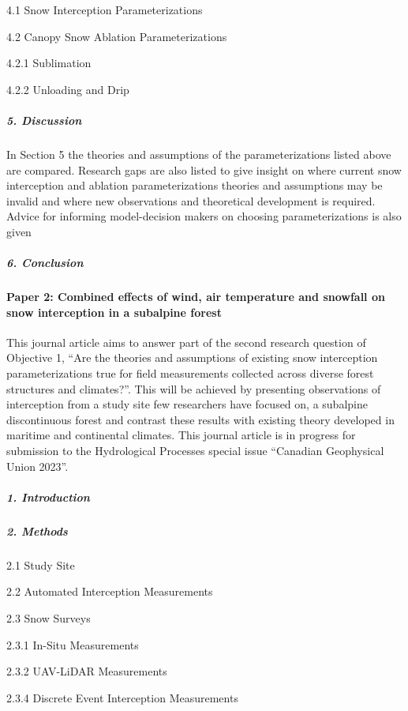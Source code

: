 \documentclass[
  letterpaper,
  DIV=11,
  numbers=noendperiod]{scrartcl}
\let\oldparagraph\paragraph
\renewcommand{\paragraph}[1]{\oldparagraph{#1}\mbox{}}
\let\oldsubparagraph\subparagraph
\renewcommand{\subparagraph}[1]{\oldsubparagraph{#1}\mbox{}}
\begin{document}
4.1 Snow Interception Parameterizations

4.2 Canopy Snow Ablation Parameterizations

4.2.1 Sublimation

4.2.2 Unloading and Drip

\subparagraph{5. Discussion}\label{discussion}

In Section 5 the theories and assumptions of the parameterizations
listed above are compared. Research gaps are also listed to give insight
on where current snow interception and ablation parameterizations
theories and assumptions may be invalid and where new observations and
theoretical development is required. Advice for informing model-decision
makers on choosing parameterizations is also given

\subparagraph{6. Conclusion}\label{conclusion}

\paragraph{Paper 2: Combined effects of wind, air temperature and
snowfall on snow interception in a subalpine
forest}\label{paper-2-combined-effects-of-wind-air-temperature-and-snowfall-on-snow-interception-in-a-subalpine-forest}

This journal article aims to answer part of the second research question
of Objective 1, ``Are the theories and assumptions of existing snow
interception parameterizations true for field measurements collected
across diverse forest structures and climates?''. This will be achieved
by presenting observations of interception from a study site few
researchers have focused on, a subalpine discontinuous forest and
contrast these results with existing theory developed in maritime and
continental climates. This journal article is in progress for submission
to the Hydrological Processes special issue ``Canadian Geophysical Union
2023''.

\subparagraph{1. Introduction}\label{introduction-2}

\subparagraph{2. Methods}\label{methods}

2.1 Study Site

2.2 Automated Interception Measurements

2.3 Snow Surveys

2.3.1 In-Situ Measurements

2.3.2 UAV-LiDAR Measurements

2.3.4 Discrete Event Interception Measurements
\end{document}
